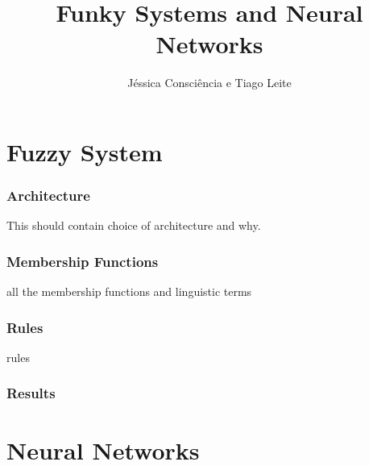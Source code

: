\documentclass[11pt]{report}
\title{Funky Systems and Neural Networks}
\author{Jéssica Consciência e Tiago Leite}
\begin{document}
\newpage

\part{Fuzzy System}
\section{Architecture}
This should contain choice of architecture and why.

\section{Membership Functions}
all the membership functions and linguistic terms

\begin{figure}
\end{figure}

\section{Rules}
rules

\section{Results}


\part{Neural Networks}
\end{document}
